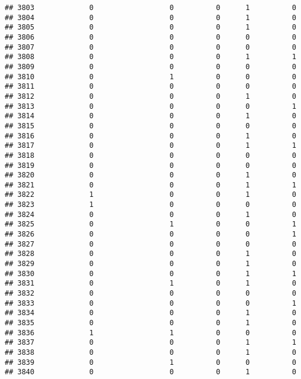 \documentclass[
]{article}
\begin{document}
\begin{verbatim}
## 3803             0                  0          0      1          0
## 3804             0                  0          0      1          0
## 3805             0                  0          0      1          0
## 3806             0                  0          0      0          0
## 3807             0                  0          0      0          0
## 3808             0                  0          0      1          1
## 3809             0                  0          0      0          0
## 3810             0                  1          0      0          0
## 3811             0                  0          0      0          0
## 3812             0                  0          0      1          0
## 3813             0                  0          0      0          1
## 3814             0                  0          0      1          0
## 3815             0                  0          0      0          0
## 3816             0                  0          0      1          0
## 3817             0                  0          0      1          1
## 3818             0                  0          0      0          0
## 3819             0                  0          0      0          0
## 3820             0                  0          0      1          0
## 3821             0                  0          0      1          1
## 3822             1                  0          0      1          0
## 3823             1                  0          0      0          0
## 3824             0                  0          0      1          0
## 3825             0                  1          0      0          1
## 3826             0                  0          0      0          1
## 3827             0                  0          0      0          0
## 3828             0                  0          0      1          0
## 3829             0                  0          0      1          0
## 3830             0                  0          0      1          1
## 3831             0                  1          0      1          0
## 3832             0                  0          0      0          0
## 3833             0                  0          0      0          1
## 3834             0                  0          0      1          0
## 3835             0                  0          0      1          0
## 3836             1                  1          0      0          0
## 3837             0                  0          0      1          1
## 3838             0                  0          0      1          0
## 3839             0                  1          0      0          0
## 3840             0                  0          0      1          0

\end{verbatim}
\end{document}
